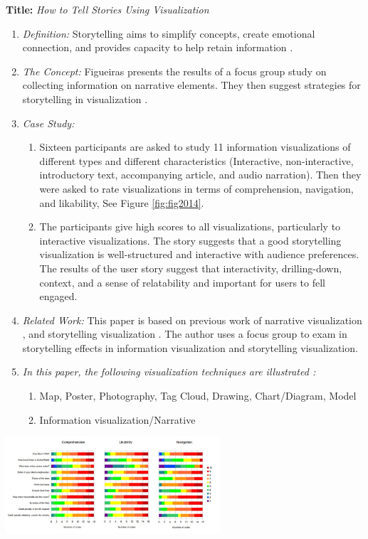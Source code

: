 \documentclass{egpubl}
\begin{document}
\textbf{Title:} \textit{How to Tell Stories Using Visualization}
\begin{enumerate}
\item \textit{Definition:} Storytelling aims to simplify concepts, create emotional connection, and provides capacity to help retain information \cite{figueiras2014tell}.
\item \textit{The Concept:} Figueiras presents the results of a focus group study on collecting information on narrative elements. They then suggest strategies for storytelling in visualization \cite{figueiras2014tell}.
\item  \textit{Case Study:} 
\begin{enumerate}
\item Sixteen participants are asked to study 11 information visualizations of different types and different characteristics (Interactive, non-interactive, introductory text, accompanying article, and audio narration). Then they were asked to rate visualizations in terms of  comprehension, navigation, and likability, See Figure \ref{fig:fig2014}. 
\item The participants give high scores to all visualizations, particularly to interactive visualizations. The story suggests that a good storytelling visualization is well-structured and interactive with audience preferences. The results of the user story suggest that interactivity, drilling-down, context, and a sense of relatability and important for users to fell engaged.
\end{enumerate}
\item \textit{Related Work:} This paper is based on previous work of narrative visualization \cite{segal}, and storytelling visualization \cite{Kosara,sci}. The author uses a focus group to exam in storytelling effects in information visualization and storytelling visualization.
\item \textit{In this paper, the following visualization techniques are illustrated :} 
\begin{enumerate}
\item Map, Poster, Photography, Tag Cloud, Drawing, Chart/Diagram, Model
\item Information visualization/Narrative
\end{enumerate}
\end{enumerate}

\begingroup
\centering
\includegraphics[width=8cm]{./images/fig2014}
\label{fig:fig2014}
\endgroup
\end{document}
